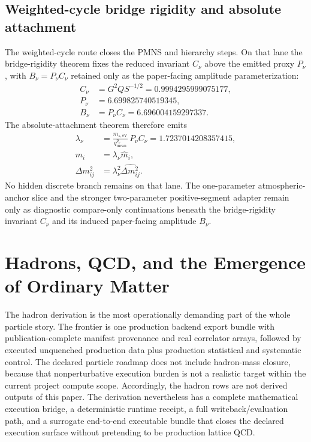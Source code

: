 \documentclass[11pt]{article}
\begin{document}
\subsection{Weighted-cycle bridge rigidity and absolute attachment}

The weighted-cycle route closes the PMNS and hierarchy steps. On that lane the
bridge-rigidity theorem fixes the reduced invariant \(C_\nu\) above the emitted
proxy \(P_\nu\), with \(B_\nu=P_\nu C_\nu\) retained only as the paper-facing
amplitude parameterization:
\[
\begin{aligned}
C_\nu&=G^2Q S^{-1/2}=0.9994295999075177,\\
P_\nu&=6.699825740519345,\\
B_\nu&=P_\nu C_\nu=6.696004159297337.
\end{aligned}
\]
The absolute-attachment theorem therefore emits
\[
\begin{aligned}
\lambda_\nu&=\frac{m_{\star,\mathrm{eV}}}{q_{\mathrm{mean}}^{p_\nu}}\,P_\nu C_\nu=1.7237014208357415,\\
m_i&=\lambda_\nu \hat m_i,\\
\Delta m_{ij}^2&=\lambda_\nu^2\widehat{\Delta m_{ij}^2}.
\end{aligned}
\]
No hidden discrete branch remains on that lane. The one-parameter atmospheric-anchor slice and
the stronger two-parameter positive-segment adapter remain only as diagnostic compare-only
continuations beneath the bridge-rigidity invariant \(C_\nu\) and its induced paper-facing amplitude \(B_\nu\).

\section{Hadrons, QCD, and the Emergence of Ordinary Matter}

The hadron derivation is the most operationally demanding part of the whole particle story. The
frontier is one production backend export bundle with publication-complete manifest provenance and real correlator arrays, followed by executed unquenched production data plus
production statistical and systematic control. The declared particle roadmap does not include hadron-mass closure, because that nonperturbative execution burden is not a realistic target within the current project compute scope. Accordingly, the hadron rows are not
derived outputs of this paper. The derivation nevertheless has a complete
mathematical execution bridge, a deterministic runtime receipt, a full writeback/evaluation path,
and a surrogate end-to-end executable bundle that closes the declared execution surface without
pretending to be production lattice QCD.
\end{document}
